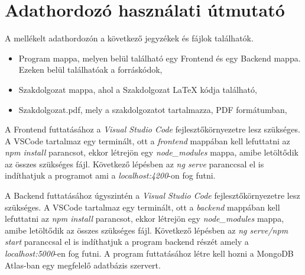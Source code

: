 \pagestyle{empty}

\section*{Adathordozó használati útmutató}

\vskip 1cm

A mellékelt adathordozón a következő jegyzékek és fájlok találhatók.


\begin{itemize}
\item Program mappa, melyen belül található egy Frontend és egy Backend mappa. Ezeken belül találhatóak a forráskódok,
\item Szakdolgozat mappa, ahol a Szakdolgozat LaTeX kódja található,
\item Szakdolgozat.pdf, mely a szakdolgozatot tartalmazza, PDF formátumban,
\end{itemize}

A Frontend futtatásához a \textit{Visual Studio Code} fejlesztőkörnyezetre lesz szükséges. A VSCode tartalmaz egy terminált, ott a \textit{frontend} mappában kell lefuttatni az \textit{npm install} parancsot, ekkor létrejön egy \textit{node\_modules} mappa, amibe letöltődik az összes szükséges fájl. Következő lépésben az \textit{ng serve} paranccsal el is indíthatjuk a programot ami a \textit{localhost:4200}-on fog futni.

A Backend futtatásához úgyszintén a \textit{Visual Studio Code} fejlesztőkörnyezetre lesz szükséges. A VSCode tartalmaz egy terminált, ott a \textit{backend} mappában kell lefuttatni az \textit{npm install} parancsot, ekkor létrejön egy \textit{node\_modules} mappa, amibe letöltődik az összes szükséges fájl. Következő lépésben az \textit{ng serve/npm start} paranccsal el is indíthatjuk a program backend részét amely a \textit{localhost:5000}-en fog futni. A program futtatásához létre kell hozni a MongoDB Atlas-ban egy megfelelő adatbázis szervert.